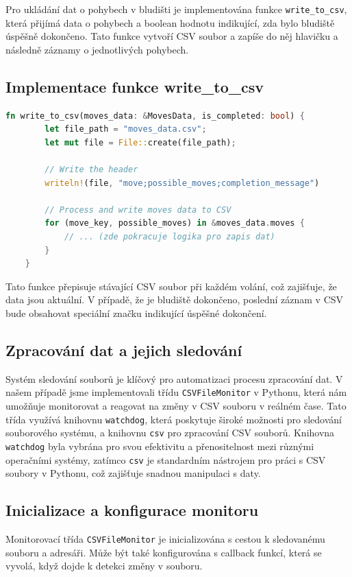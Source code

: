 \documentclass[12pt, a4paper,
twoside,        %
openright
]{report}
\begin{document}
Pro ukládání dat o pohybech v bludišti je implementována funkce \texttt{write\_to\_csv}, která přijímá data o pohybech a boolean hodnotu indikující, zda bylo bludiště úspěšně dokončeno. Tato funkce vytvoří CSV soubor a zapíše do něj hlavičku a následně záznamy o jednotlivých pohybech.


\subsection{Implementace funkce write\_to\_csv}

\begin{lstlisting}[language=rust, caption={Funkce pro zápis do CSV souboru}]
	fn write_to_csv(moves_data: &MovesData, is_completed: bool) {
		let file_path = "moves_data.csv";
		let mut file = File::create(file_path);
		
		// Write the header
		writeln!(file, "move;possible_moves;completion_message")
		
		// Process and write moves data to CSV
		for (move_key, possible_moves) in &moves_data.moves {
			// ... (zde pokracuje logika pro zapis dat)
		}
	}
\end{lstlisting}

Tato funkce přepisuje stávající CSV soubor při každém volání, což zajišťuje, že data jsou aktuální. V případě, že je bludiště dokončeno, poslední záznam v CSV bude obsahovat speciální značku indikující úspěšné dokončení.

\newpage
\subsection{Zpracování dat a jejich sledování}

Systém sledování souborů je klíčový pro automatizaci procesu zpracování dat. V našem případě jsme implementovali třídu \texttt{CSVFileMonitor} v Pythonu, která nám umožňuje monitorovat a reagovat na změny v CSV souboru v reálném čase. Tato třída využívá knihovnu \texttt{watchdog}, která poskytuje široké možnosti pro sledování souborového systému, a knihovnu \texttt{csv} pro zpracování CSV souborů. Knihovna \texttt{watchdog} byla vybrána pro svou efektivitu a přenositelnost mezi různými operačními systémy, zatímco \texttt{csv} je standardním nástrojem pro práci s CSV soubory v Pythonu, což zajišťuje snadnou manipulaci s daty.

\subsection{Inicializace a konfigurace monitoru}
Monitorovací třída \texttt{CSVFileMonitor} je inicializována s cestou k sledovanému souboru a adresáři. Může být také konfigurována s callback funkcí, která se vyvolá, když dojde k detekci změny v souboru.
\end{document}
